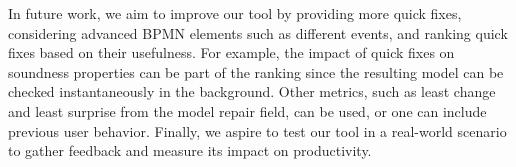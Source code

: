 \documentclass[runningheads]{llncs}
\begin{document}
In future work, we aim to improve our tool by providing more quick fixes, considering advanced BPMN elements such as different events, and ranking quick fixes based on their usefulness.
For example, the impact of quick fixes on soundness properties can be part of the ranking since the resulting model can be checked instantaneously in the background.
Other metrics, such as least change and least surprise from the model repair field, can be used, or one can include previous user behavior.
Finally, we aspire to test our tool in a real-world scenario to gather feedback and measure its impact on productivity.



\end{document}
